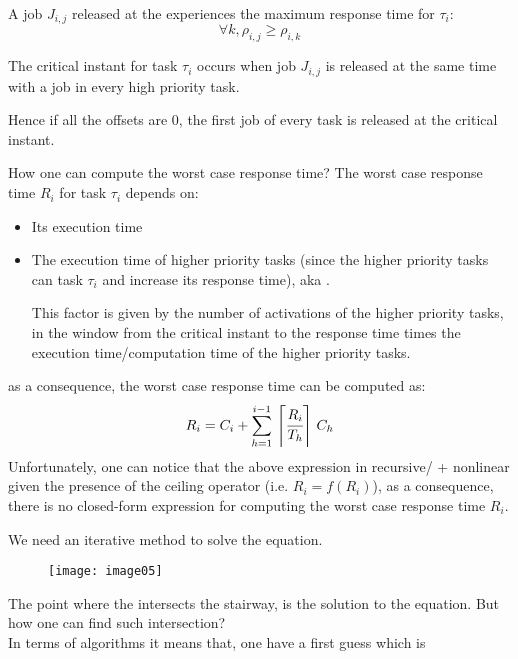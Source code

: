 A job $J_{i,j}$ released at the  experiences the maximum response time for $\tau_i$:
\[\forall k, \rho_{i,j} \ge \rho_{i,k}\]
\begin{theorem}
The critical instant for task $\tau_i$ occurs when job $J_{i,j}$ is released at the same time with a job in every high priority task.
\end{theorem}
Hence if all the offsets are 0, the first job of every task is released at the critical instant.

How one can compute the worst case response time?
The worst case response time $R_i$ for task $\tau_i$ depends on:
\begin{itemize}
\item Its execution time
\item The execution time of higher priority tasks (since the higher priority tasks can  task $\tau_i$ and increase its response time), aka .

This factor is given by the number of activations of the higher priority tasks, in the window from the critical instant to the response time times the execution time/computation time of the higher priority tasks.
\end{itemize}
as a consequence, the worst case response time can be computed as:
\[R_i = C_i + \sum_{h=1}^{i-1}\,\left\lceil \cfrac{R_i}{T_h} \right\rceil\,C_h\]
Unfortunately, one can notice that the above expression in recursive/ + nonlinear given the presence of the ceiling operator (i.e. $R_i = f(R_i)$), as a consequence, there is no closed-form expression for computing the worst case response time $R_i$.

We need an iterative method to solve the equation.

\begin{figure}[!h]
\centering
\texttt{[image: image05]}
\end{figure}
The point where the  intersects the stairway, is the solution to the equation. But how one can find such intersection?\\
In terms of algorithms it means that, one have a first guess which is

